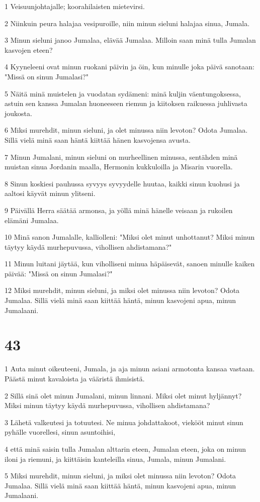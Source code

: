 \par 1 Veisuunjohtajalle; koorahilaisten mietevirsi.
\par 2 Niinkuin peura halajaa vesipuroille, niin minun sieluni halajaa sinua, Jumala.
\par 3 Minun sieluni janoo Jumalaa, elävää Jumalaa. Milloin saan minä tulla Jumalan kasvojen eteen?
\par 4 Kyyneleeni ovat minun ruokani päivin ja öin, kun minulle joka päivä sanotaan: "Missä on sinun Jumalasi?"
\par 5 Näitä minä muistelen ja vuodatan sydämeni: minä kuljin väentungoksessa, astuin sen kanssa Jumalan huoneeseen riemun ja kiitoksen raikuessa juhlivasta joukosta.
\par 6 Miksi murehdit, minun sieluni, ja olet minussa niin levoton? Odota Jumalaa. Sillä vielä minä saan häntä kiittää hänen kasvojensa avusta.
\par 7 Minun Jumalani, minun sieluni on murheellinen minussa, sentähden minä muistan sinua Jordanin maalla, Hermonin kukkuloilla ja Misarin vuorella.
\par 8 Sinun koskiesi pauhussa syvyys syvyydelle huutaa, kaikki sinun kuohusi ja aaltosi käyvät minun ylitseni.
\par 9 Päivällä Herra säätää armonsa, ja yöllä minä hänelle veisaan ja rukoilen elämäni Jumalaa.
\par 10 Minä sanon Jumalalle, kalliolleni: "Miksi olet minut unhottanut? Miksi minun täytyy käydä murhepuvussa, vihollisen ahdistamana?"
\par 11 Minun luitani jäytää, kun viholliseni minua häpäisevät, sanoen minulle kaiken päivää: "Missä on sinun Jumalasi?"
\par 12 Miksi murehdit, minun sieluni, ja miksi olet minussa niin levoton? Odota Jumalaa. Sillä vielä minä saan kiittää häntä, minun kasvojeni apua, minun Jumalaani.

\chapter{43}

\par 1 Auta minut oikeuteeni, Jumala, ja aja minun asiani armotonta kansaa vastaan. Päästä minut kavaloista ja vääristä ihmisistä.
\par 2 Sillä sinä olet minun Jumalani, minun linnani. Miksi olet minut hyljännyt? Miksi minun täytyy käydä murhepuvussa, vihollisen ahdistamana?
\par 3 Lähetä valkeutesi ja totuutesi. Ne minua johdattakoot, viekööt minut sinun pyhälle vuorellesi, sinun asuntoihisi,
\par 4 että minä saisin tulla Jumalan alttarin eteen, Jumalan eteen, joka on minun iloni ja riemuni, ja kiittäisin kanteleilla sinua, Jumala, minun Jumalani.
\par 5 Miksi murehdit, minun sieluni, ja miksi olet minussa niin levoton? Odota Jumalaa. Sillä vielä minä saan kiittää häntä, minun kasvojeni apua, minun Jumalaani.

